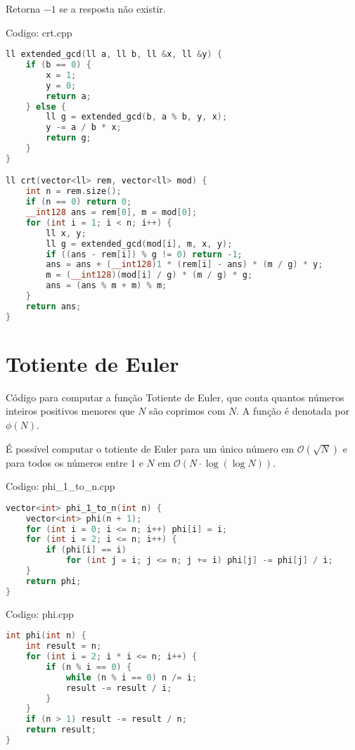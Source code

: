 \documentclass[10pt, a4paper, oneside]{book}
\begin{document}
Retorna $-1$ se a resposta não existir.

\hfill

Codigo: crt.cpp

\begin{lstlisting}[language=C++]
ll extended_gcd(ll a, ll b, ll &x, ll &y) {
    if (b == 0) {
        x = 1;
        y = 0;
        return a;
    } else {
        ll g = extended_gcd(b, a % b, y, x);
        y -= a / b * x;
        return g;
    }
}

ll crt(vector<ll> rem, vector<ll> mod) {
    int n = rem.size();
    if (n == 0) return 0;
    __int128 ans = rem[0], m = mod[0];
    for (int i = 1; i < n; i++) {
        ll x, y;
        ll g = extended_gcd(mod[i], m, x, y);
        if ((ans - rem[i]) % g != 0) return -1;
        ans = ans + (__int128)1 * (rem[i] - ans) * (m / g) * y;
        m = (__int128)(mod[i] / g) * (m / g) * g;
        ans = (ans % m + m) % m;
    }
    return ans;
}
\end{lstlisting}
\hfill

\section{Totiente de Euler}


Código para computar a  função Totiente de Euler, que conta quantos números inteiros positivos menores que $N$ são coprimos com $N$. A função é denotada por $\phi(N)$.



É possível computar o totiente de Euler para um único número em $\mathcal{O}(\sqrt{N})$ e para todos os números entre $1$ e $N$ em $\mathcal{O}(N \cdot \log (\log N))$.

\hfill

Codigo: phi\_1\_to\_n.cpp

\begin{lstlisting}[language=C++]
vector<int> phi_1_to_n(int n) {
    vector<int> phi(n + 1);
    for (int i = 0; i <= n; i++) phi[i] = i;
    for (int i = 2; i <= n; i++) {
        if (phi[i] == i)
            for (int j = i; j <= n; j += i) phi[j] -= phi[j] / i;
    }
    return phi;
}
\end{lstlisting}
\hfill

Codigo: phi.cpp

\begin{lstlisting}[language=C++]
int phi(int n) {
    int result = n;
    for (int i = 2; i * i <= n; i++) {
        if (n % i == 0) {
            while (n % i == 0) n /= i;
            result -= result / i;
        }
    }
    if (n > 1) result -= result / n;
    return result;
}
\end{lstlisting}
\hfill
\end{document}
